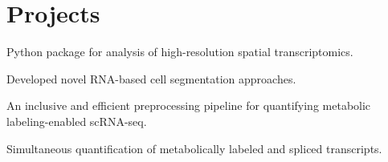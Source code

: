 \documentclass[]{resume}
\begin{document}
\hfill
\begin{minipage}[t]{0.69\textwidth}


\section{Projects}

\vspace{\topsep} %
\begin{tightemize}
\item {Python package for analysis of high-resolution spatial transcriptomics.}
\item {Developed novel RNA-based cell segmentation approaches.}
\end{tightemize}
\sectionsep

\begin{tightemize}
\item {An inclusive and efficient preprocessing pipeline for quantifying metabolic labeling-enabled scRNA-seq.}
\item {Simultaneous quantification of metabolically labeled and spliced transcripts.}
\end{tightemize}
\sectionsep




\end{minipage}
\end{document}
